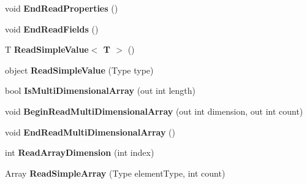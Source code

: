 \begin{DoxyCompactItemize}
\item 
\mbox{\label{interface_serialization_1_1_i_storage_a5e3376134f3047f247eaa2a6844389f3}} 
void {\bfseries End\+Read\+Properties} ()
\item 
\mbox{\label{interface_serialization_1_1_i_storage_af38f83f1eb0c5190fd0e4ad845ff0649}} 
void {\bfseries End\+Read\+Fields} ()
\item 
\mbox{\label{interface_serialization_1_1_i_storage_ae1e7a60cc8b12071f1866d2cac454f99}} 
T {\bfseries Read\+Simple\+Value$<$ T $>$} ()
\item 
\mbox{\label{interface_serialization_1_1_i_storage_a32b60329697e7f1d128801cc4ac7e614}} 
object {\bfseries Read\+Simple\+Value} (Type type)
\item 
\mbox{\label{interface_serialization_1_1_i_storage_a9fd65cc423dabd2b49021e0e7f333356}} 
bool {\bfseries Is\+Multi\+Dimensional\+Array} (out int length)
\item 
\mbox{\label{interface_serialization_1_1_i_storage_a27e63deec5c78fd5013d1d3b7607e04c}} 
void {\bfseries Begin\+Read\+Multi\+Dimensional\+Array} (out int dimension, out int count)
\item 
\mbox{\label{interface_serialization_1_1_i_storage_a449e4d99ff1a5e1a792e22955fb13018}} 
void {\bfseries End\+Read\+Multi\+Dimensional\+Array} ()
\item 
\mbox{\label{interface_serialization_1_1_i_storage_a395cc4c40bd55229df264d4187ebb018}} 
int {\bfseries Read\+Array\+Dimension} (int index)
\item 
\mbox{\label{interface_serialization_1_1_i_storage_abffb20a2280b9334bef338ccd2d7f5f5}} 
Array {\bfseries Read\+Simple\+Array} (Type element\+Type, int count)
\item 
\mbox{\label{interface_serialization_1_1_i_storage_a2178c0c68457e13a45fa7e80fa345037}} 

\end{DoxyCompactItemize}
